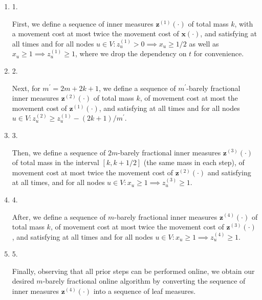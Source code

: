 \begin{enumerate}


\item[] 
1. 


First, we define a sequence of inner measures ${\mathbf{z}}^{(1)}(\cdot)$ of total mass $k$, with a movement cost at most twice the movement cost of ${\boldsymbol{x}}(\cdot)$, and satisfying at all times and for all nodes $u\in V\colon z_{u}^{(1)}>0\implies x_{u}\geq 1/2$ as well as $x_{u}\geq 1\implies z_{u}^{(1)}\geq 1$, where we drop the dependency on $t$ for convenience.\par





\item[] 
2. 


Next, for $m^{\prime}=2m+2k+1$, we define a sequence of $m^{\prime}$-barely fractional inner measures ${\mathbf{z}}^{(2)}(\cdot)$ of total mass $k$, of movement cost at most the movement cost of ${\mathbf{z}}^{(1)}(\cdot)$, and satisfying at all times and for all nodes $u\in V\colon z^{(2)}_{u}\geq z^{(1)}_{u}-(2k+1)/m^{\prime}$.\par





\item[] 
3. 


Then, we define a sequence of $2m$-barely fractional inner measures ${\mathbf{z}}^{(3)}(\cdot)$ of total mass in the interval $[k,k+1/2]$ (the same mass in each step), of movement cost at most twice the movement cost of ${\mathbf{z}}^{(2)}(\cdot)$ and satisfying at all times, and for all nodes $u\in V\colon x_{u}\geq 1\implies z_{u}^{(3)}\geq 1$.\par





\item[] 
4. 


After, we define a sequence of $m$-barely fractional inner measures ${\mathbf{z}}^{(4)}(\cdot)$ of total mass $k$, of movement cost at most twice the movement cost of ${\mathbf{z}}^{(3)}(\cdot)$, and satisfying at all times and for all nodes $u\in V\colon x_{u}\geq 1\implies z_{u}^{(4)}\geq 1$.\par





\item[] 
5. 


Finally, observing that all prior steps can be performed online, we obtain our desired $m$-barely fractional online algorithm by converting the sequence of inner measures ${\mathbf{z}}^{(4)}(\cdot)$ into a sequence of leaf measures.\par





\end{enumerate}





